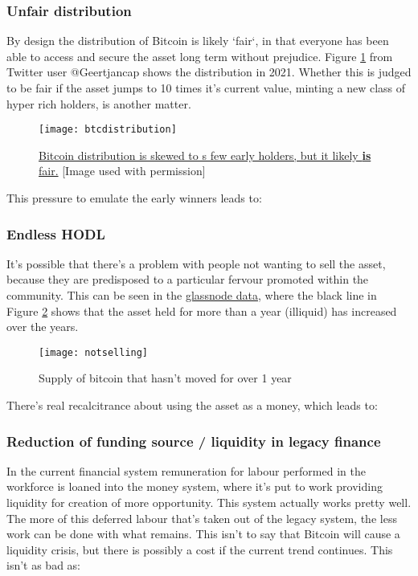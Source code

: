 \subsubsection{Unfair distribution}
By design the distribution of Bitcoin is likely `fair`, in that everyone has been able to access and secure the asset long term without prejudice. Figure \ref{fig:btcdistribution} from Twitter user @Geertjancap shows the distribution in 2021. Whether this is judged to be fair if the asset jumps to 10 times it's current value, minting a new class of hyper rich holders, is another matter. 
\begin{figure}
  \centering
    \texttt{[image: btcdistribution]}
  \caption{\href{https://twitter.com/Geertjancap/status/1380972132990136322/photo/1}{Bitcoin distribution is skewed to s few early holders, but it likely \textbf{is} fair.} [Image used with permission]}
  \label{fig:btcdistribution}
\end{figure}
This pressure to emulate the early winners leads to:
\subsubsection{Endless HODL}
It's possible that there's a problem with people not wanting to sell the asset, because they are predisposed to a particular fervour promoted within the community. This can be seen in the \href{https://twitter.com/DylanLeClair_/status/1521123370233962497}{glassnode data}, where the black line in Figure \ref{fig:notselling} shows that the asset held for more than a year (illiquid) has increased over the years.
\begin{figure}
  \centering
    \texttt{[image: notselling]}
  \caption{Supply of bitcoin that hasn't moved for over 1 year}
  \label{fig:notselling}
\end{figure}
There's real recalcitrance about using the asset as a money, which leads to:
\subsubsection{Reduction of funding source / liquidity in legacy finance}
In the current financial system remuneration for labour performed in the workforce is loaned into the money system, where it's put to work providing liquidity for creation of more opportunity. This system actually works pretty well. The more of this deferred labour that's taken out of the legacy system, the less work can be done with what remains. This isn't to say that Bitcoin will cause a liquidity crisis, but there is possibly a cost if the current trend continues. This isn't as bad as:
